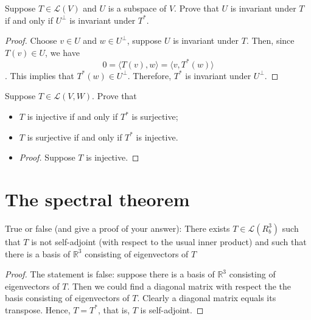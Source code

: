 \begin{exercise}
  Suppose $T \in \mathcal{L}(V)$ and $U$ is a subspace of $V$.
  Prove that $U$ is invariant under $T$ if and only if $U^\perp$
  is invariant under $T^*$.
\end{exercise}

\begin{proof}
  Choose $v \in U$ and $w \in U^\perp$,  suppose $U$ is invariant under $T$.
  Then, since $T(v) \in U$, we have \[
    0 = \langle T(v), w \rangle = \langle v, T^*(w) \rangle
  \]. This implies that $T^*(w) \in U^\perp$.
  Therefore, $T^*$ is invariant under $U^\perp$.
\end{proof}

\begin{exercise}
  Suppose $T \in \mathcal{L}(V, W)$. Prove that
  \begin{itemize}[(a)]
    \item $T$ is injective if and only if $T^*$ is surjective;
    \item $T$ is surjective if and only if $T^*$ is injective.
  \end{itemize}
\end{exercise}

\begin{itemize}[(a)]
  \item
    \begin{proof}
      Suppose $T$ is injective.
    \end{proof}
\end{itemize}

\section{The spectral theorem}

\begin{exercise}
  True or false (and give a proof of your answer): There exists $T \in \mathcal{L}(R_b^3)$
  such that $T$ is not self-adjoint (with respect to the usual inner product)
  and such that there is a basis of $\mathbb{R}^3 $ consisting of eigenvectors of $T$
\end{exercise}

\begin{proof}
  The statement is false: suppose there is a basis of $\mathbb{R}^3$ consisting
  of eigenvectors of $T$. Then we could find a diagonal matrix with
  respect the the basis consisting of eigenvectors of $T$. Clearly
  a diagonal matrix equals its transpose. Hence, $T = T^*$, that is,
  $T$ is self-adjoint.
\end{proof}

